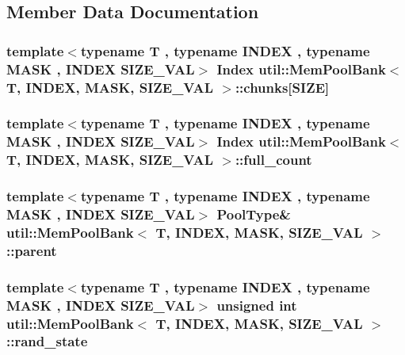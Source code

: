 \subsection{Member Data Documentation}
\hypertarget{structutil_1_1MemPoolBank_afbe62c62e0076ca9da5dd74ebae1727e}{
\subsubsection[{chunks}]{\setlength{\rightskip}{0pt plus 5cm}template$<$typename T , typename I\-N\-D\-E\-X , typename M\-A\-S\-K , I\-N\-D\-E\-X S\-I\-Z\-E\-\_\-\-V\-A\-L$>$ {\bf Index} {\bf util\-::\-Mem\-Pool\-Bank}$<$ T, I\-N\-D\-E\-X, M\-A\-S\-K, S\-I\-Z\-E\-\_\-\-V\-A\-L $>$\-::chunks\mbox{[}{\bf S\-I\-Z\-E}\mbox{]}}}\label{structutil_1_1MemPoolBank_afbe62c62e0076ca9da5dd74ebae1727e}
\hypertarget{structutil_1_1MemPoolBank_a789d940942286b2e8d251709f343895e}{
\subsubsection[{full\-\_\-count}]{\setlength{\rightskip}{0pt plus 5cm}template$<$typename T , typename I\-N\-D\-E\-X , typename M\-A\-S\-K , I\-N\-D\-E\-X S\-I\-Z\-E\-\_\-\-V\-A\-L$>$ {\bf Index} {\bf util\-::\-Mem\-Pool\-Bank}$<$ T, I\-N\-D\-E\-X, M\-A\-S\-K, S\-I\-Z\-E\-\_\-\-V\-A\-L $>$\-::full\-\_\-count}}\label{structutil_1_1MemPoolBank_a789d940942286b2e8d251709f343895e}
\hypertarget{structutil_1_1MemPoolBank_aab9a0222c55ef5021dd4134b24c19e32}{
\subsubsection[{parent}]{\setlength{\rightskip}{0pt plus 5cm}template$<$typename T , typename I\-N\-D\-E\-X , typename M\-A\-S\-K , I\-N\-D\-E\-X S\-I\-Z\-E\-\_\-\-V\-A\-L$>$ {\bf Pool\-Type}\& {\bf util\-::\-Mem\-Pool\-Bank}$<$ T, I\-N\-D\-E\-X, M\-A\-S\-K, S\-I\-Z\-E\-\_\-\-V\-A\-L $>$\-::parent}}\label{structutil_1_1MemPoolBank_aab9a0222c55ef5021dd4134b24c19e32}
\hypertarget{structutil_1_1MemPoolBank_a43ec026289969363cba9a80f59d5f9b7}{
\subsubsection[{rand\-\_\-state}]{\setlength{\rightskip}{0pt plus 5cm}template$<$typename T , typename I\-N\-D\-E\-X , typename M\-A\-S\-K , I\-N\-D\-E\-X S\-I\-Z\-E\-\_\-\-V\-A\-L$>$ unsigned int {\bf util\-::\-Mem\-Pool\-Bank}$<$ T, I\-N\-D\-E\-X, M\-A\-S\-K, S\-I\-Z\-E\-\_\-\-V\-A\-L $>$\-::rand\-\_\-state}}\label{structutil_1_1MemPoolBank_a43ec026289969363cba9a80f59d5f9b7}
